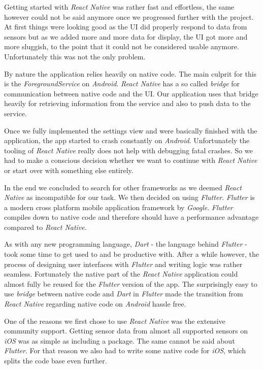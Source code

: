 Getting started with \textit{React Native} was rather fast and effortless, the same however could
not be said anymore once we progressed further with the project. At first things were looking good
as the UI did properly respond to data from sensors but as we added more and more data for
display, the UI got more and more sluggish, to the point that it could not be considered usable
anymore. Unfortunately this was not the only problem.

By nature the application relies heavily on native code. The main culprit for this is the
\textit{ForegroundService} on \textit{Android}. \textit{React Native} has a so called
\textit{bridge} for communication between native code and the UI. Our application
uses that bridge heavily for retrieving information from the service and also to push data to the
service.

Once we fully implemented the settings view and were basically finished with the application, the
app started to crash constantly on \textit{Android}. Unfortunately the tooling of \textit{React
Native} really does not help with debugging fatal crashes. So we had to make a conscious decision
whether we want to continue with \textit{React Native} or start over with something else entirely.

In the end we concluded to search for other frameworks as we deemed \textit{React Native} as
incompatible for our task. We then decided on using \textit{Flutter}. \textit{Flutter} is a modern
cross platform mobile application framework by \textit{Google}. \textit{Flutter} compiles down to
native code and therefore should have a performance advantage compared to \textit{React Native}.

As with any new programming language, \textit{Dart} - the language behind \textit{Flutter} - took
some time to get used to and be productive with. After a while however, the process of designing user
interfaces with \textit{Flutter} and writing logic was rather seamless. Fortunately the native part
of the \textit{React Native} application could almost fully be reused for the \textit{Flutter}
version of the app. The surprisingly easy to use \textit{bridge} between native code and
\textit{Dart} in \textit{Flutter} made the transition from \textit{React Native} regarding native
code on \textit{Android} hassle free.

One of the reasons we first chose to use \textit{React Native} was the extensive community support.
Getting sensor data from almost all supported sensors on \textit{iOS} was as simple as including a
package. The same cannot be said about \textit{Flutter}. For that reason we also had to write some
native code for \textit{iOS}, which splits the code base even further.

